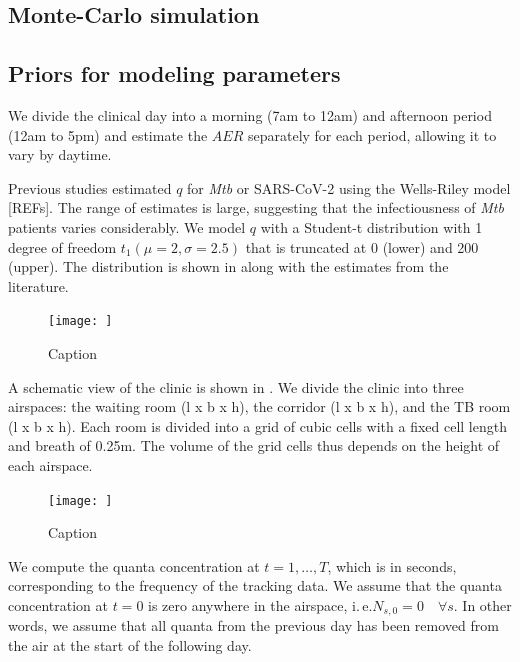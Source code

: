 \documentclass[fleqn,11pt]{wlscirep_supp}
\newcommand\ie{i.\,e.\xspace}
\begin{document}
\subsection{Monte-Carlo simulation}

\subsection{Priors for modeling parameters}


We divide the clinical day into a morning (7am to 12am) and afternoon period (12am to 5pm) and estimate the $AER$ separately for each period, allowing it to vary by daytime.

Previous studies estimated $q$ for \emph{Mtb} or SARS-CoV-2 using the Wells-Riley model [REFs]. The range of estimates is large, suggesting that the infectiousness of \emph{Mtb} patients varies considerably. We model $q$ with a Student-t distribution with 1 degree of freedom $t_1(\mu = 2, \sigma = 2.5)$ that is truncated at 0 (lower) and 200 (upper). The distribution is shown in  along with the estimates from the literature.


\begin{figure}
    \centering
    \texttt{[image: ]}
    \caption{Caption}
    \label{fig:quanta-distribution}
\end{figure}


A schematic view of the clinic is shown in . We divide the clinic into three airspaces: the waiting room (l x b x h), the corridor (l x b x h), and the TB room (l x b x h). Each room is divided into a grid of cubic cells with a fixed cell length and breath of 0.25m. The volume of the grid cells thus depends on the height of each airspace. 

\begin{figure}
    \centering
    \texttt{[image: ]}
    \caption{Caption}
    \label{fig:clinic}
\end{figure}

We compute the quanta concentration at $t = 1, \dots, T$, which is in seconds, corresponding to the frequency of the tracking data. We assume that the quanta concentration at $t=0$ is zero anywhere in the airspace, \ie $N_{s,0} = 0 \quad \forall s$. In other words, we assume that all quanta from the previous day has been removed from the air at the start of the following day. 

\clearpage


\end{document}
